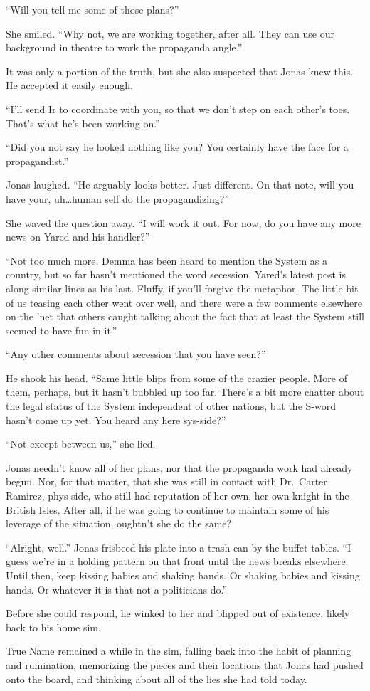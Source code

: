``Will you tell me some of those plans?''

She smiled. ``Why not, we are working together, after all. They can use our background in theatre to work the propaganda angle.''

It was only a portion of the truth, but she also suspected that Jonas knew this. He accepted it easily enough.

``I'll send Ir to coordinate with you, so that we don't step on each other's toes. That's what he's been working on.''

``Did you not say he looked nothing like you? You certainly have the face for a propagandist.''

Jonas laughed. ``He arguably looks better. Just different. On that note, will you have your, uh\ldots human self do the propagandizing?''

She waved the question away. ``I will work it out. For now, do you have any more news on Yared and his handler?''

``Not too much more. Demma has been heard to mention the System as a country, but so far hasn't mentioned the word secession. Yared's latest post is along similar lines as his last. Fluffy, if you'll forgive the metaphor. The little bit of us teasing each other went over well, and there were a few comments elsewhere on the 'net that others caught talking about the fact that at least the System still seemed to have fun in it.''

``Any other comments about secession that you have seen?''

He shook his head. ``Same little blips from some of the crazier people. More of them, perhaps, but it hasn't bubbled up too far. There's a bit more chatter about the legal status of the System independent of other nations, but the S-word hasn't come up yet. You heard any here sys-side?''

``Not except between us,'' she lied.

Jonas needn't know all of her plans, nor that the propaganda work had already begun. Nor, for that matter, that she was still in contact with Dr.~Carter Ramirez, phys-side, who still had reputation of her own, her own knight in the British Isles. After all, if he was going to continue to maintain some of his leverage of the situation, oughtn't she do the same?

``Alright, well.'' Jonas frisbeed his plate into a trash can by the buffet tables. ``I guess we're in a holding pattern on that front until the news breaks elsewhere. Until then, keep kissing babies and shaking hands. Or shaking babies and kissing hands. Or whatever it is that not-a-politicians do.''

Before she could respond, he winked to her and blipped out of existence, likely back to his home sim.

True Name remained a while in the sim, falling back into the habit of planning and rumination, memorizing the pieces and their locations that Jonas had pushed onto the board, and thinking about all of the lies she had told today.
